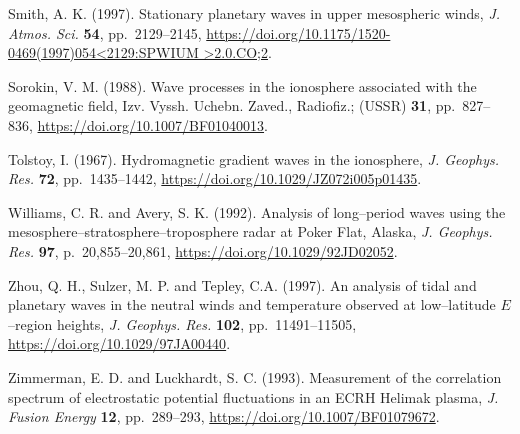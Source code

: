 \documentclass[a4paper,openany,12pt]{book}
\begin{document}
\begin{thebibliography}{100}
\bibitem{}
Smith, A. K. (1997). Stationary planetary waves in upper mesospheric winds, {\it J. Atmos. Sci.} \textbf{54}, pp.~2129--2145, \url{https://doi.org/10.1175/1520-0469(1997)054<2129:SPWIUM >2.0.CO;2}.

\bibitem{}
Sorokin, V. M. (1988). Wave processes in the ionosphere associated with the geomagnetic field, Izv. Vyssh. Uchebn. Zaved., Radiofiz.; (USSR) \textbf{31}, pp.~827--836, \url{https://doi.org/10.1007/BF01040013}.

\bibitem{}
Tolstoy, I. (1967). Hydromagnetic gradient waves in the ionosphere, \emph{J. Geophys. Res.} \textbf{72}, pp.~1435--1442, \url{https://doi.org/10.1029/JZ072i005p01435}. 

\bibitem{}
Williams, C. R. and Avery, S. K. (1992). Analysis of long--period waves using the mesosphere--stratosphere--troposphere radar at Poker Flat, Alaska, {\it J. Geophys. Res.} \textbf{97}, 
p.~20,855--20,861, \url{https://doi.org/10.1029/92JD02052}.

\bibitem{}
Zhou, Q. H., Sulzer, M. P. and Tepley, C.A. (1997). An analysis of tidal and planetary waves in the neutral winds and temperature observed at low--latitude $E$--region heights, {\it J. Geophys. Res.} \textbf{102}, pp.~11491--11505, 
\url{https://doi.org/10.1029/97JA00440}.

\bibitem{}
Zimmerman, E. D. and Luckhardt, S. C. (1993). Measurement of the correlation spectrum of electrostatic potential fluctuations in an ECRH Helimak plasma, {\it J. Fusion Energy} \textbf{12}, pp.~289--293, \url{https://doi.org/10.1007/BF01079672}.

\end{thebibliography}
\end{document}
